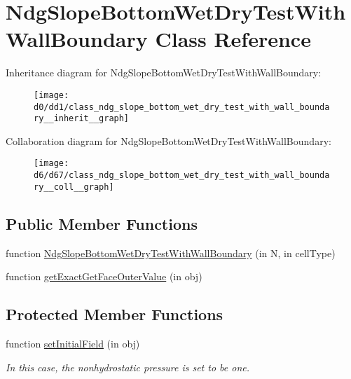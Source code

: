 \hypertarget{class_ndg_slope_bottom_wet_dry_test_with_wall_boundary}{}\section{Ndg\+Slope\+Bottom\+Wet\+Dry\+Test\+With\+Wall\+Boundary Class Reference}
\label{class_ndg_slope_bottom_wet_dry_test_with_wall_boundary}


Inheritance diagram for Ndg\+Slope\+Bottom\+Wet\+Dry\+Test\+With\+Wall\+Boundary\+:
\nopagebreak
\begin{figure}[H]
\begin{center}
\leavevmode
\texttt{[image: d0/dd1/class\_ndg\_slope\_bottom\_wet\_dry\_test\_with\_wall\_boundary\_\_inherit\_\_graph]}
\end{center}
\end{figure}


Collaboration diagram for Ndg\+Slope\+Bottom\+Wet\+Dry\+Test\+With\+Wall\+Boundary\+:
\nopagebreak
\begin{figure}[H]
\begin{center}
\leavevmode
\texttt{[image: d6/d67/class\_ndg\_slope\_bottom\_wet\_dry\_test\_with\_wall\_boundary\_\_coll\_\_graph]}
\end{center}
\end{figure}
\subsection*{Public Member Functions}
\begin{DoxyCompactItemize}
\item 
function \hyperlink{class_ndg_slope_bottom_wet_dry_test_with_wall_boundary_ab1dee7f18ae598445d1d164050f739ac}{Ndg\+Slope\+Bottom\+Wet\+Dry\+Test\+With\+Wall\+Boundary} (in N, in cell\+Type)
\item 
function \hyperlink{class_ndg_slope_bottom_wet_dry_test_with_wall_boundary_a574e154e7ae491bcc97731865e5a143a}{get\+Exact\+Get\+Face\+Outer\+Value} (in obj)
\end{DoxyCompactItemize}
\subsection*{Protected Member Functions}
\begin{DoxyCompactItemize}
\item 
function \hyperlink{class_ndg_slope_bottom_wet_dry_test_with_wall_boundary_aab568c5a3586063208e444de25efe0c4}{set\+Initial\+Field} (in obj)
\begin{DoxyCompactList}\small\item\em In this case, the nonhydrostatic pressure is set to be one. \end{DoxyCompactList}\end{DoxyCompactItemize}
